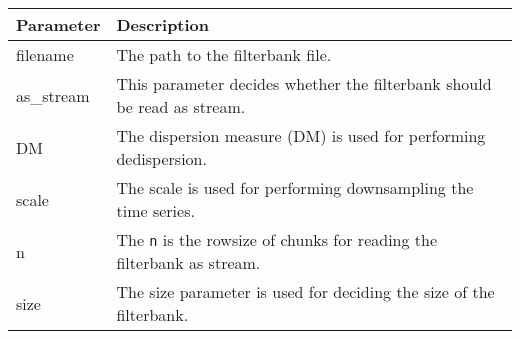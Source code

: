 \documentclass[]{article}
\begin{document}
\begin{longtable}[]{@{}ll@{}}
\toprule
\begin{minipage}[b]{0.41\columnwidth}\raggedright\strut
Parameter\strut
\end{minipage} & \begin{minipage}[b]{0.41\columnwidth}\raggedright\strut
Description\strut
\end{minipage}\tabularnewline
\midrule
\endhead
\begin{minipage}[t]{0.41\columnwidth}\raggedright\strut
filename\strut
\end{minipage} & \begin{minipage}[t]{0.41\columnwidth}\raggedright\strut
The path to the filterbank file.\strut
\end{minipage}\tabularnewline
\begin{minipage}[t]{0.41\columnwidth}\raggedright\strut
as\_stream\strut
\end{minipage} & \begin{minipage}[t]{0.41\columnwidth}\raggedright\strut
This parameter decides whether the filterbank should be read as
stream.\strut
\end{minipage}\tabularnewline
\begin{minipage}[t]{0.41\columnwidth}\raggedright\strut
DM\strut
\end{minipage} & \begin{minipage}[t]{0.41\columnwidth}\raggedright\strut
The dispersion measure (DM) is used for performing dedispersion.\strut
\end{minipage}\tabularnewline
\begin{minipage}[t]{0.41\columnwidth}\raggedright\strut
scale\strut
\end{minipage} & \begin{minipage}[t]{0.41\columnwidth}\raggedright\strut
The scale is used for performing downsampling the time series.\strut
\end{minipage}\tabularnewline
\begin{minipage}[t]{0.41\columnwidth}\raggedright\strut
n\strut
\end{minipage} & \begin{minipage}[t]{0.41\columnwidth}\raggedright\strut
The \texttt{n} is the rowsize of chunks for reading the filterbank as
stream.\strut
\end{minipage}\tabularnewline
\begin{minipage}[t]{0.41\columnwidth}\raggedright\strut
size\strut
\end{minipage} & \begin{minipage}[t]{0.41\columnwidth}\raggedright\strut
The size parameter is used for deciding the size of the
filterbank.\strut
\end{minipage}\tabularnewline
\bottomrule
\end{longtable}
\end{document}
